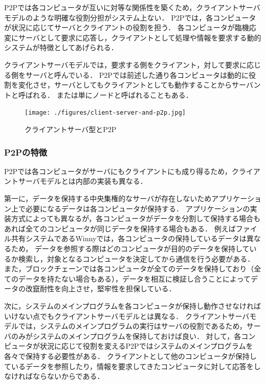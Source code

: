 P2Pでは各コンピュータが互いに対等な関係性を築くため，クライアントサーバモデルのような明確な役割分担がシステム上ない．
P2Pでは，各コンピュータが状況に応じてサーバとクライアントの役割を担う．
各コンピュータが臨機応変にサーバとして要求に応答し，クライアントとして処理や情報を要求する動的システムが特徴としてあげられる．

クライアントサーバモデルでは，要求する側をクライアント，対して要求に応じる側をサーバと呼んでいる．
P2Pでは前述した通り各コンピュータは動的に役割を変化させ，サーバとしてもクライアントとしても動作することからサーバントと呼ばれる．
または単にノードと呼ばれることもある．

\begin{figure}[htbp]
  \begin{center}
    \texttt{[image: ./figures/client-server-and-p2p.jpg]}
    \caption{クライアントサーバ型とP2P}
  \end{center}
\end{figure}

\subsubsection{P2Pの特徴}

P2Pでは各コンピュータがサーバにもクライアントにも成り得るため，クライアントサーバモデルとは内部の実装も異なる．

第一に，データを保持する中央集権的なサーバが存在しないためアプリケーション上で必要になるデータは各コンピュータが保持する．
アプリケーションの実装方式によっても異なるが，各コンピュータがデータを分割して保持する場合もあれば全てのコンピュータが同じデータを保持する場合もある．
例えばファイル共有システムであるWinnyでは，各コンピュータの保持しているデータは異なるため，
データを参照する際はどのコンピュータが目的のデータを保持しているか検索し，対象となるコンピュータを決定してから通信を行う必要がある．
また，ブロックチェーンでは各コンピュータが全てのデータを保持しており（全てのデータを持たない場合もある），データを相互に検証し合うことによってデータの改竄耐性を向上させ，堅牢性を担保している．

次に，システムのメインプログラムを各コンピュータが保持し動作させなければいけない点でもクライアントサーバモデルとは異なる．
クライアントサーバモデルでは，システムのメインプログラムの実行はサーバの役割であるため，サーバのみがシステムのメインプログラムを保持しておけば良い．
対して，各コンピュータが状況に応じて役割を変えるP2Pではシステムのメインプログラムを各々で保持する必要性がある．
クライアントとして他のコンピュータが保持しているデータを参照したり，情報を要求してきたコンピュータに対して応答をしなければならないからである．

